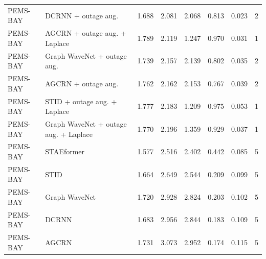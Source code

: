 \begin{tabular}{llrrrrrr}
PEMS-BAY & DCRNN + outage aug. & 1.688 & 2.081 & 2.068 & 0.813 & 0.023 & 2 \\
PEMS-BAY & AGCRN + outage aug. + Laplace & 1.789 & 2.119 & 1.247 & 0.970 & 0.031 & 1 \\
PEMS-BAY & Graph WaveNet + outage aug. & 1.739 & 2.157 & 2.139 & 0.802 & 0.035 & 2 \\
PEMS-BAY & AGCRN + outage aug. & 1.762 & 2.162 & 2.153 & 0.767 & 0.039 & 2 \\
PEMS-BAY & STID + outage aug. + Laplace & 1.777 & 2.183 & 1.209 & 0.975 & 0.053 & 1 \\
PEMS-BAY & Graph WaveNet + outage aug. + Laplace & 1.770 & 2.196 & 1.359 & 0.929 & 0.037 & 1 \\
PEMS-BAY & STAEformer & 1.577 & 2.516 & 2.402 & 0.442 & 0.085 & 5 \\
PEMS-BAY & STID & 1.664 & 2.649 & 2.544 & 0.209 & 0.099 & 5 \\
PEMS-BAY & Graph WaveNet & 1.720 & 2.928 & 2.824 & 0.203 & 0.102 & 5 \\
PEMS-BAY & DCRNN & 1.683 & 2.956 & 2.844 & 0.183 & 0.109 & 5 \\
PEMS-BAY & AGCRN & 1.731 & 3.073 & 2.952 & 0.174 & 0.115 & 5 \\
\bottomrule
\end{tabular}
